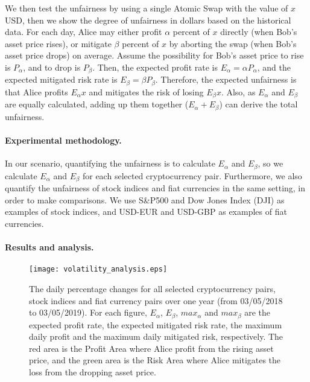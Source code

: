 We then test the unfairness by using a single Atomic Swap with the value of $x$ USD, then we show the degree of unfairness in dollars based on the historical data.
For each day, Alice may either profit $\alpha$ percent of $x$ directly (when Bob's asset price rises),
or mitigate $\beta$ percent of $x$ by aborting the swap (when Bob's asset price drops) on average.
Assume the possibility for Bob's asset price to rise is $P_{\alpha}$, and to drop is $P_{\beta}$.
Then, the expected profit rate is $E_{\alpha} = \alpha P_{\alpha}$,
and the expected mitigated risk rate is $E_{\beta} = \beta P_{\beta}$.
Therefore, the expected unfairness is that Alice profits $E_{\alpha} x$ and mitigates the risk of losing $E_{\beta} x$.
Also, as $E_\alpha$ and $E_\beta$ are equally calculated, adding up them together ($E_\alpha + E_\beta$) can derive the total unfairness.

\paragraph{Experimental methodology.}
In our scenario, quantifying the unfairness is to calculate $E_{\alpha}$ and $E_{\beta}$,
so we calculate $E_{\alpha}$ and $E_{\beta}$ for each selected cryptocurrency pair.
Furthermore,  we also quantify the unfairness of stock indices and fiat currencies in the same setting, in order to make comparisons.
We use S\&P500 and Dow Jones Index (DJI) as examples of stock indices, and USD-EUR and USD-GBP as examples of fiat currencies.

\paragraph{Results and analysis.}

\begin{figure*}[htp]
    \texttt{[image: volatility\_analysis.eps]}
    \caption{The daily percentage changes for all selected cryptocurrency pairs, stock indices and fiat currency pairs over one year (from 03/05/2018 to 03/05/2019).
    For each figure, $E_{\alpha}$, $E_{\beta}$, $max_\alpha$ and $max_\beta$ are the expected profit rate, the expected mitigated risk rate, the maximum daily profit and the maximum daily mitigated risk, respectively.
    The red area is the Profit Area where Alice profit from the rising asset price, and the green area is the Risk Area where Alice mitigates the loss from the dropping asset price.}
    \label{fig:volatility_analysis}
\end{figure*}

